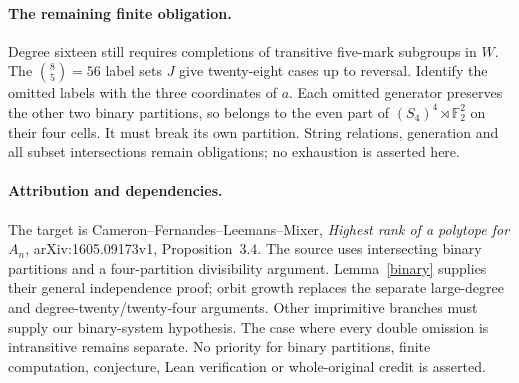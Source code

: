 \documentclass[11pt,a4paper]{article}
\begin{document}
\paragraph{The remaining finite obligation.}
Degree sixteen still requires completions of transitive five-mark
subgroups in $W$. The $\binom85=56$ label sets $J$ give twenty-eight
cases up to reversal. Identify the omitted labels with the three
coordinates of $a$. Each omitted generator preserves the other
two binary partitions, so belongs to the even part of
$(S_4)^4\rtimes\mathbb F_2^2$ on their four cells. It must break
its own partition. String relations, generation and all subset
intersections remain obligations; no exhaustion is asserted here.

\paragraph{Attribution and dependencies.}
The target is Cameron--Fernandes--Leemans--Mixer,
\emph{Highest rank of a polytope for $A_n$}, arXiv:1605.09173v1,
Proposition~3.4. The source uses intersecting binary partitions
and a four-partition divisibility argument. Lemma~\ref{binary}
supplies their general independence proof; orbit growth replaces
the separate large-degree and degree-twenty/twenty-four arguments.
Other imprimitive branches must supply our binary-system hypothesis.
The case where every double omission is intransitive remains separate.
No priority for binary partitions, finite computation, conjecture,
Lean verification or whole-original credit is asserted.
\end{document}

